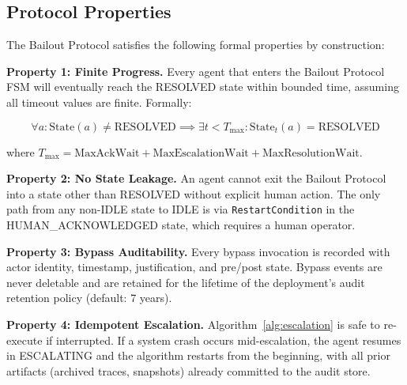 \bigskip
\subsection{Protocol Properties}

The Bailout Protocol satisfies the following formal properties by construction:

\bigskip
\noindent\textbf{Property 1: Finite Progress.} Every agent that enters the Bailout Protocol FSM will eventually reach the RESOLVED state within bounded time, assuming all timeout values are finite. Formally:

\[
\forall a: \text{State}(a) \neq \text{RESOLVED} \implies \exists t < T_{\max}: \text{State}_t(a) = \text{RESOLVED}
\]

where $T_{\max} = \text{MaxAckWait} + \text{MaxEscalationWait} + \text{MaxResolutionWait}$.

\bigskip
\noindent\textbf{Property 2: No State Leakage.} An agent cannot exit the Bailout Protocol into a state other than RESOLVED without explicit human action. The only path from any non-IDLE state to IDLE is via \texttt{RestartCondition} in the HUMAN\_ACKNOWLEDGED state, which requires a human operator.

\bigskip
\noindent\textbf{Property 3: Bypass Auditability.} Every bypass invocation is recorded with actor identity, timestamp, justification, and pre/post state. Bypass events are never deletable and are retained for the lifetime of the deployment's audit retention policy (default: 7 years).

\bigskip
\noindent\textbf{Property 4: Idempotent Escalation.} Algorithm~\ref{alg:escalation} is safe to re-execute if interrupted. If a system crash occurs mid-escalation, the agent resumes in ESCALATING and the algorithm restarts from the beginning, with all prior artifacts (archived traces, snapshots) already committed to the audit store.

